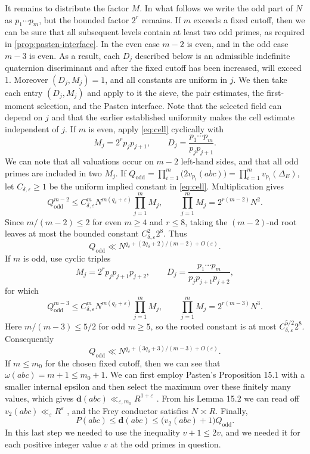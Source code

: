 \documentclass[11pt,reqno]{amsart}
\theoremstyle{definition}
\newcommand{\dd}{\mathbf d}
\newcommand{\eps}{\varepsilon}
\begin{document}
It remains to distribute the factor $M$. In what follows we write the odd part of $N$ as $p_1\cdots p_m$, but the
bounded factor $2^r$ remains. If $m$ exceeds a fixed cutoff, then we can be sure that all subsequent
levels contain at least two odd primes, as required in
\cref{prop:pasten-interface}. In the even case
$m-2$ is even, and in the odd case $m-3$ is even. As a result, each $D_j$ described below is an admissible indefinite
quaternion discriminant and after the fixed cutoff has been increased, will
exceed 1. Moreover $(D_j,M_j)=1$, and all
constants are uniform in $j$. 
We then take each entry $(D_j,M_j)$ and apply to it the sieve,
the pair estimates, the first-moment selection, and the Pasten interface. Note that the selected field can depend on $j$ and that the earlier
established uniformity makes the cell estimate independent of $j$. If $m$ is even, apply \eqref{eq:cell}
cyclically with
\[
 M_j=2^rp_jp_{j+1},\qquad
 D_j=\frac{p_1\cdots p_m}{p_jp_{j+1}}.
\]
We can note that all valuations occur on $m-2$ left-hand sides, and that all
odd primes are included in two $M_j$. If $Q_{\mathrm{odd}}=\prod_{i=1}^m\bigl(2v_{p_i}(abc)\bigr)
=\prod_{i=1}^m v_{p_i}(\Delta_E)$, let $C_{\delta,\eps}\geq1$ be the uniform implied
constant in \eqref{eq:cell}.  Multiplication gives
\[
 Q_{\mathrm{odd}}^{m-2}
 \leq C_{\delta,\eps}^mN^{m(q_\delta+\eps)}\prod_{j=1}^mM_j,
 \qquad
 \prod_{j=1}^mM_j
 =2^{r(m-2)}N^2.
\]
Since $m/(m-2)\leq2$ for even $m\geq4$ and $r\leq8$, taking the
$(m-2)$-nd root leaves at most the bounded constant
$C_{\delta,\eps}^2 2^8$.  Thus
\begin{equation}\label{eq:even-prop}
 Q_{\mathrm{odd}}
 \ll N^{q_\delta+(2q_\delta+2)/(m-2)+O(\eps)}.
\end{equation}
If $m$ is odd, use cyclic triples
\[
 M_j=2^rp_jp_{j+1}p_{j+2},\qquad
 D_j=\frac{p_1\cdots p_m}{p_jp_{j+1}p_{j+2}},
\]
for which
\[
 Q_{\mathrm{odd}}^{m-3}
 \leq C_{\delta,\eps}^mN^{m(q_\delta+\eps)}\prod_{j=1}^mM_j,
 \qquad
 \prod_{j=1}^mM_j=2^{r(m-3)}N^3.
\]
Here $m/(m-3)\leq5/2$ for odd $m\geq5$, so the rooted constant is at
most $C_{\delta,\eps}^{5/2}2^8$.  Consequently
\begin{equation}\label{eq:odd-prop}
 Q_{\mathrm{odd}}
 \ll N^{q_\delta+(3q_\delta+3)/(m-3)+O(\eps)}.
\end{equation}
If $m\leq m_0$ for the chosen fixed cutoff, then we can see that
$\omega(abc)=m+1\leq m_0+1$. We can first employ Pasten's Proposition 15.1 with a smaller internal epsilon
and then select the maximum over these finitely many values, which gives
$\dd(abc)\ll_{\eps,m_0}R^{1+\eps}$ \cite[Proposition 15.1]{Pasten}. From his
Lemma 15.2 we can read off $v_2(abc)\ll_\eps R^\eps$ \cite[Lemma 15.2 and Equation
(16.4)]{Pasten}, and the Frey conductor satisfies $N\asymp R$. Finally,
\[
 P(abc)\leq\dd(abc)
 \leq\bigl(v_2(abc)+1\bigr)Q_{\mathrm{odd}}.
\]
In this last step we needed to use the inequality $v+1\leq2v$, and we needed
it for each positive integer value $v$ at the odd primes in question.
\end{document}
